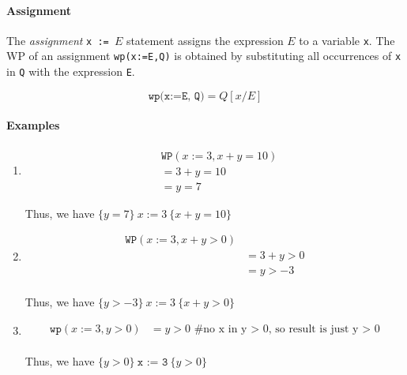 \documentclass[oneside,11pt,dvipsnames]{book}
\newcommand{\code}[1]{\texttt{#1}}
\begin{document}
\paragraph{Assignment} The \emph{assignment} \code{x\ :=\ $E$} statement assigns the expression
$E$ to a variable \code{x}. The WP of an assignment \code{wp(x:=E,Q)} is obtained by substituting all occurrences of
\code{x} in \code{Q} with the expression \code{E}. 

\begin{equation}\label{eq:wp-assign}
    \code{wp(x:=E, Q)} = Q[x/E]
\end{equation}

\paragraph{Examples}
\begin{enumerate}
\item      
\begin{equation*}
    \begin{split}
        &\code{WP}(x:=3, x + y = 10) \\
        &= 3 + y = 10\\ 
        &= y = 7
    \end{split}
\end{equation*}

Thus, we have $\{y=7\} ~x := 3~ \{x + y = 10\}$

\item 
\begin{equation*}
    \begin{split}
        \code{WP}(x:=3, x + y > 0) \\
        &= 3 + y > 0  \\
        &= y > -3\\
    \end{split}
\end{equation*}


Thus, we have $\{y > -3\}  ~x := 3~ \{x + y> 0\}$

\item 
\begin{equation*}
    \begin{split}
        \code{wp}(x:=3, y > 0) &= y > 0 \text{ \# no x in y > 0, so result is just y > 0}\\
    \end{split}    
\end{equation*}

Thus, we have $\{y > 0\}  ~\code{x := 3}~ \{y > 0\}$
\end{enumerate}
\end{document}
